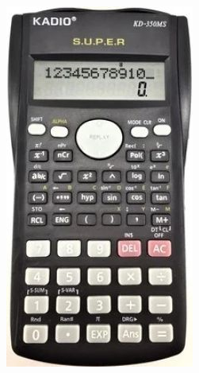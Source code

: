 \begin{figure}
	\centering
	\includegraphics[width=0.5\linewidth]{"kadio/kadio kd-350ms"}
	\caption[KD-350ms front]{}
	\label{fig:kadio-kd-350ms2}
\end{figure}

